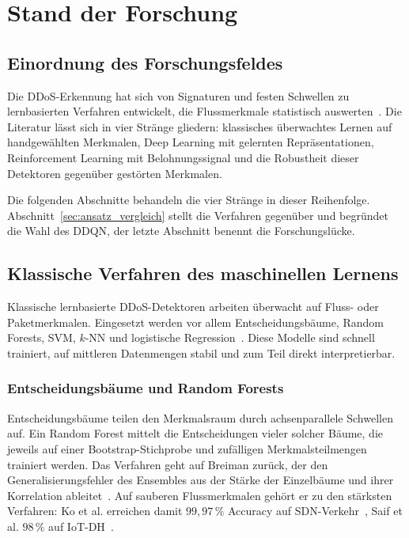 \chapter{Stand der Forschung}
\label{chap:related_work}

\section{Einordnung des Forschungsfeldes}

Die DDoS-Erkennung hat sich von Signaturen und festen Schwellen zu lernbasierten Verfahren entwickelt, die Flussmerkmale statistisch auswerten~\autocite{balaAITechniquesIoTbased2024, kumarComprehensiveReviewVulnerabilities2024}. Die Literatur lässt sich in vier Stränge gliedern: klassisches überwachtes Lernen auf handgewählten Merkmalen, Deep Learning mit gelernten Repräsentationen, Reinforcement Learning mit Belohnungssignal und die Robustheit dieser Detektoren gegenüber gestörten Merkmalen.

Die folgenden Abschnitte behandeln die vier Stränge in dieser Reihenfolge. Abschnitt~\ref{sec:ansatz_vergleich} stellt die Verfahren gegenüber und begründet die Wahl des DDQN, der letzte Abschnitt benennt die Forschungslücke.

\section{Klassische Verfahren des maschinellen Lernens}

Klassische lernbasierte DDoS-Detektoren arbeiten überwacht auf Fluss- oder Paketmerkmalen. Eingesetzt werden vor allem Entscheidungsbäume, Random Forests, SVM, $k$-NN und logistische Regression~\autocite{balaAITechniquesIoTbased2024}. Diese Modelle sind schnell trainiert, auf mittleren Datenmengen stabil und zum Teil direkt interpretierbar.

\subsection{Entscheidungsbäume und Random Forests}

Entscheidungsbäume teilen den Merkmalsraum durch achsenparallele Schwellen auf. Ein Random Forest mittelt die Entscheidungen vieler solcher Bäume, die jeweils auf einer Bootstrap-Stichprobe und zufälligen Merkmalsteilmengen trainiert werden. Das Verfahren geht auf Breiman zurück, der den Generalisierungsfehler des Ensembles aus der Stärke der Einzelbäume und ihrer Korrelation ableitet~\autocite{breimanRandomForests2001}. Auf sauberen Flussmerkmalen gehört er zu den stärksten Verfahren: Ko et al. erreichen damit $99{,}97\,\%$ Accuracy auf SDN-Verkehr~\autocite{koComparativeStudyAIEnabled2023}, Saif et al. $98\,\%$ auf \mbox{IoT-DH}~\autocite{saifIoTDHDatasetClassification2024}.

